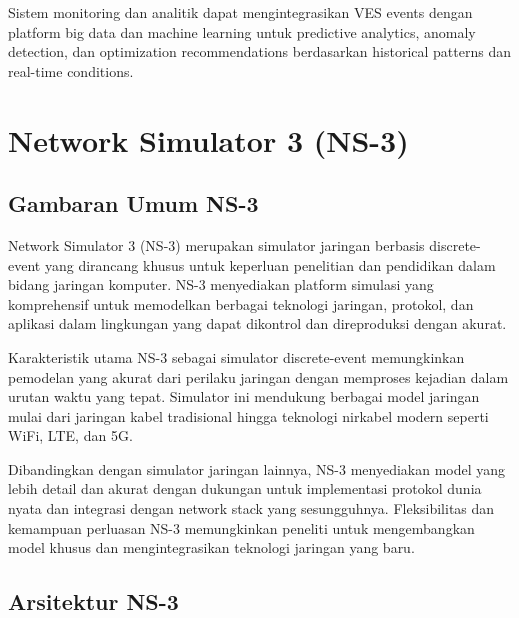 Sistem monitoring dan analitik dapat mengintegrasikan VES events dengan platform big data dan machine learning untuk predictive analytics, anomaly detection, dan optimization recommendations berdasarkan historical patterns dan real-time conditions.

\section{Network Simulator 3 (NS-3)}

\subsection{Gambaran Umum NS-3}

Network Simulator 3 (NS-3) merupakan simulator jaringan berbasis discrete-event yang dirancang khusus untuk keperluan penelitian dan pendidikan dalam bidang jaringan komputer. NS-3 menyediakan platform simulasi yang komprehensif untuk memodelkan berbagai teknologi jaringan, protokol, dan aplikasi dalam lingkungan yang dapat dikontrol dan direproduksi dengan akurat.

Karakteristik utama NS-3 sebagai simulator discrete-event memungkinkan pemodelan yang akurat dari perilaku jaringan dengan memproses kejadian dalam urutan waktu yang tepat. Simulator ini mendukung berbagai model jaringan mulai dari jaringan kabel tradisional hingga teknologi nirkabel modern seperti WiFi, LTE, dan 5G.

Dibandingkan dengan simulator jaringan lainnya, NS-3 menyediakan model yang lebih detail dan akurat dengan dukungan untuk implementasi protokol dunia nyata dan integrasi dengan network stack yang sesungguhnya. Fleksibilitas dan kemampuan perluasan NS-3 memungkinkan peneliti untuk mengembangkan model khusus dan mengintegrasikan teknologi jaringan yang baru.


\subsection{Arsitektur NS-3}

